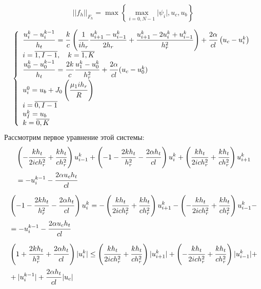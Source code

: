 \documentclass[a4paper,12pt,russian, fleqn]{extreport}
\begin{document}
 	\begin{equation*}
 		\lvert\lvert f_h \rvert\rvert_{F_h} = \max\left\{\max\limits_{i=\overline{0, N-1}}\vert \psi_i \vert, u_c, u_b \right\}
 	\end{equation*}
 	
 	\begin{equation*}
 	\left\{\begin{array}{l}
 	\dfrac{\strut u_i^{k}-u_i^{k-1}}{\strut h_t} = \dfrac{\strut k}{\strut c}\left(\dfrac{\strut 1}{\strut ih_r}\dfrac{\strut u_{i+1}^k - u_{i-1}^k}{\strut 2h_r} +\dfrac{\strut u_{i+1}^k - 2u_i^k + u_{i-1}^k}{\strut h^2_r}\right) + \dfrac{\strut 2\alpha}{\strut cl}\left (u_c - u_i^k \right) \\
 	i = \overline{1,I-1}, \quad k = \overline{1,K}	 \\
 	\dfrac{\strut u_0^{k}-u_0^{k-1}}{\strut h_t} = \dfrac{\strut 2k}{\strut c}\dfrac{\strut u_1^k-u_0^k}{\strut h_r^2} + \dfrac{\strut 2\alpha}{\strut cl}(u_c-u_0^k) \\
 	u_i^0 = u_b + J_0\left( \dfrac{\strut \mu_1 ih_r}{\strut R} \right) \\
 	i = \overline{0, I-1} \\
 	u_I^k = u_b \\
 	k = \overline{0,K}
 	\end{array}\right.
 	\end{equation*}
 	Рассмотрим первое уравнение этой системы:
 	\begin{align}
		& \left(-\dfrac{\strut k h_t}{\strut 2ich_r^2} + \dfrac{\strut k h_t}{\strut c h_r^2}\right) u^k_{i-1} + \left(  - 1 - \dfrac{\strut 2 k h_t}{\strut h_r^2} - \dfrac{\strut 2 \alpha h_t}{\strut cl} \right)u^k_i + \left( \dfrac{\strut k h_t}{\strut 2ich_r^2} + \dfrac{\strut k h_t}{\strut c h_r^2} \right) u^k_{i+1} \nonumber \\ 
		& = -u_i^{k-1} - \dfrac{\strut 2\alpha u_c h_t}{\strut cl} 	\nonumber	
 	\end{align}
 	\begin{align}
	 	& \left(  - 1 - \dfrac{\strut 2 k h_t}{\strut h_r^2} - \dfrac{\strut 2 \alpha h_t}{\strut cl} \right)u^k_i = - \left( \dfrac{\strut k h_t}{\strut 2ich_r^2} + \dfrac{\strut k h_t}{\strut c h_r^2} \right) u^k_{i+1} -\left(-\dfrac{\strut k h_t}{\strut 2ich_r^2} + \dfrac{\strut k h_t}{\strut c h_r^2}\right) u^k_{i-1} - \nonumber \\
		& = -u_i^{k-1} - \dfrac{\strut 2\alpha u_c h_t}{\strut cl} 	\nonumber	
 	\end{align}
 	\begin{align}
	 	& \left(  1 + \dfrac{\strut 2 k h_t}{\strut h_r^2} + \dfrac{\strut 2 \alpha h_t}{\strut cl} \right)\lvert u^k_i \rvert \leq \left( \dfrac{\strut k h_t}{\strut 2ich_r^2} + \dfrac{\strut k h_t}{\strut c h_r^2} \right) \lvert u^k_{i+1} \rvert +\left(-\dfrac{\strut k h_t}{\strut 2ich_r^2} + \dfrac{\strut k h_t}{\strut c h_r^2}\right) \lvert u^k_{i-1} \rvert + \nonumber \\
	 	& + \lvert u_i^{k-1} \rvert + \dfrac{\strut 2\alpha h_t}{\strut cl}\lvert u_c \rvert 	\nonumber	
 	\end{align}
\end{document}
